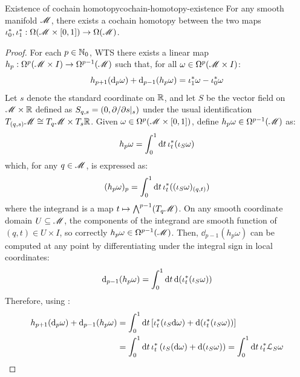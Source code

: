 \begin{lemma}{Existence of cochain homotopy}{cochain-homotopy-existence}
  For any smooth manifold $ \mathscr{M} $, there exists a cochain homotopy between the two maps $ \iota_0^* , \iota_1^* : \Omega(\mathscr{M} \times [0,1]) \rightarrow \Omega(\mathscr{M}) $.
\end{lemma}

\begin{proofbox}
  \begin{proof}
    For each $ p \in \mathbb{N}_0 $, WTS there exists a linear map $ h_p : \Omega^{p}(\mathscr{M} \times I) \rightarrow \Omega^{p-1}(\mathscr{M}) $ such that, for all $ \omega \in \Omega^{p}(\mathscr{M} \times I) $:
    \begin{equation*}
      h_{p+1}(\mathrm{d}_p \omega) + \mathrm{d}_{p-1} (h_p \omega) = \iota_1^* \omega - \iota_0^* \omega
    \end{equation*}
    Let $ s $ denote the standard coordinate on $ \mathbb{R} $, and let $ S $ be the vector field on $ \mathscr{M} \times \mathbb{R} $ defined as $ S_{q,s} = (0 , \partial/\partial s \vert_s) $ under the usual identification $ T_{(q,s)}\mathscr{M} \cong T_q\mathscr{M} \times T_s\mathbb{R} $. Given $ \omega \in \Omega^{p}(\mathscr{M} \times [0,1]) $, define $ h_p \omega \in \Omega^{p-1}(\mathscr{M}) $ as:
    \begin{equation*}
      h_p \omega = \int_0^1 \mathrm{d} t \, \iota_t^* (\iota_S \omega)
    \end{equation*}
    which, for any $ q \in \mathscr{M} $, is expressed as:
    \begin{equation*}
      (h_p \omega)_p = \int_0^1 \mathrm{d} t \, \iota_t^* ((\iota_S \omega)_{(q,t)})
    \end{equation*}
    where the integrand is a map $ t \mapsto {\bigwedge}^{p-1}(T_q\mathscr{M}) $. On any smooth coordinate domain $ U \subseteq \mathscr{M} $, the components of the integrand are smooth function of $ (q,t) \in U \times I $, so correctly $ h_p \omega \in \Omega^{p-1}(\mathscr{M}) $. Then, $ \dd_{p-1} (h_p \omega) $ can be computed at any point by differentiating under the integral sign in local coordinates:
    \begin{equation*}
      \mathrm{d}_{p-1} (h_p \omega) = \int_0^1 \mathrm{d} t \, \mathrm{d} (\iota_t^* (\iota_S \omega))
    \end{equation*}
    Therefore, using :
    \begin{equation*}
      \begin{split}
        h_{p+1} (\dd_p \omega) + \dd_{p-1} (h_p \omega)
        & = \int_0^1 \dd t \left[ \inc_t^* (\ip_S \dd \omega) + \dd (\inc_t^* (\ip_S \omega)) \right] \\
        & = \int_0^1 \dd t \, \inc_t^* \left( \ip_S (\dd \omega) + \dd (\ip_S \omega) \right) = \int_0^1 \dd t \, \inc_t^* \ld_S \omega

\end{split}
\end{equation*}
\end{proof}
\end{proofbox}
